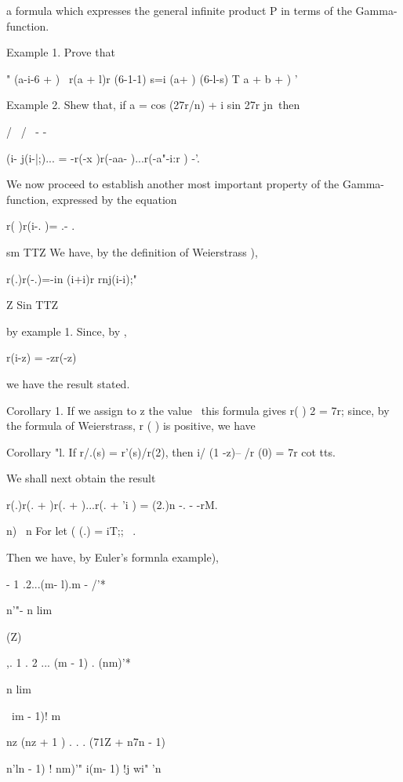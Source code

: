 a formula which expresses the general infinite product P in terms of
the Gamma-function.

Example 1. Prove that

 " (a-i-6 + ) \ r(a + l)r (6-1-1) s=i (a+ ) (6-l-s) T a + b + ) '

Example 2. Shew that, if a = cos (27r/n) + i sin 27r jn\ then

/ \ / \ - -

 (i- j(i-|;)... = -r(-x )r(-aa- )...r(-a"-i:r ) -'.


We now proceed to establish another most important property of the
Gamma-function, expressed by the equation

r( )r(i-. )= .- .

sm TTZ We have, by the definition of Weierstrass ),

r(.)r(-.)=-in (i+i)r rnj(i-i);"

Z Sin TTZ

by  example 1. Since, by ,

r(i-z) = -zr(-z)

we have the result stated.

%
%

Corollary 1. If we assign to z the value \, this formula gives r( ) 2
= 7r; since, by the formula of Weierstrass, r ( ) is positive, we
have

Corollary "l. If r/.(s) = r'(s)/r(2), then i/ (1 -z)-- /r (0) = 7r cot
tts.

We shall next obtain the result

r(.)r(. + )r(. + )...r(. + 'i ) = (2.)n -. - -rM.

n) \ n For let ( (.) = iT;; \ .

Then we have, by Euler's formnla  example),

 - 1 .2...(m- l).m - /'*

n'"- n lim

 (Z)

,. 1 . 2 ... (m - 1) . (nm)'*

n lim

\ im - 1)! m

nz (nz + 1 ) . . . (71Z + n7n - 1)

 n'ln - 1) ! nm)'" i(m- 1) !j wi" 'n

